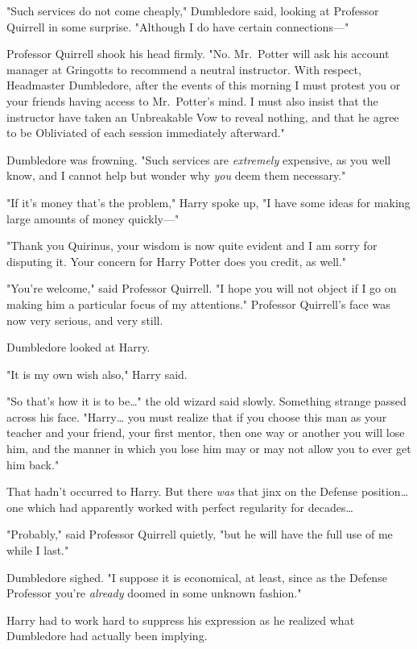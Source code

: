 "Such services do not come cheaply," Dumbledore said, looking at Professor
Quirrell in some surprise. "Although I do have certain connections---"

Professor Quirrell shook his head firmly. "No. Mr.~Potter will ask his account
manager at Gringotts to recommend a neutral instructor. With respect,
Headmaster Dumbledore, after the events of this morning I must protest you or
your friends having access to Mr.~Potter's mind. I must also insist that the
instructor have taken an Unbreakable Vow to reveal nothing, and that he agree
to be Obliviated of each session immediately afterward."

Dumbledore was frowning. "Such services are \emph{extremely} expensive, as you
well know, and I cannot help but wonder why \emph{you} deem them necessary."

"If it's money that's the problem," Harry spoke up, "I have some ideas for
making large amounts of money quickly---"

"Thank you Quirinus, your wisdom is now quite evident and I am sorry for
disputing it. Your concern for Harry Potter does you credit, as well."

"You're welcome," said Professor Quirrell. "I hope you will not object if I go
on making him a particular focus of my attentions." Professor Quirrell's face
was now very serious, and very still.

Dumbledore looked at Harry.

"It is my own wish also," Harry said.

"So that's how it is to be{\ldots}" the old wizard said slowly. Something
strange passed across his face. "Harry{\ldots} you must realize that if you
choose this man as your teacher and your friend, your first mentor, then one
way or another you will lose him, and the manner in which you lose him may or
may not allow you to ever get him back."

That hadn't occurred to Harry. But there \emph{was} that jinx on the Defense
position{\ldots} one which had apparently worked with perfect regularity for
decades{\ldots}

"Probably," said Professor Quirrell quietly, "but he will have the full use of
me while I last."

Dumbledore sighed. "I suppose it is economical, at least, since as the Defense
Professor you're \emph{already} doomed in some unknown fashion."

Harry had to work hard to suppress his expression as he realized what
Dumbledore had actually been implying.

